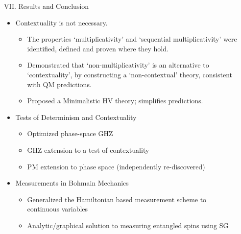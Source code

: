 \documentclass[final,hyperref={pdfpagelabels=false}]{beamer}
\begin{document}
\begin{frame}[t]
\begin{columns}[c]
\begin{column}{.69\textwidth}
\begin{columns}[b]
\begin{column}{.48\textwidth}

        \end{column}

        \begin{column}{.47\textwidth}



          \begin{block}{VII. Results and Conclusion}
            \begin{itemize}
            \item Contextuality is not necessary.
              {\tiny
              \begin{itemize}
              \item The properties `multiplicativity' and `sequential multiplicativity' were identified, defined and proven where they hold.
              \item Demonstrated that `non-multiplicativity' is an alternative to `contextuality', by constructing a `non-contextual' theory, consistent with QM predictions.
              \item Proposed a Minimalistic HV theory; simplifies predictions.
              \end{itemize}}
            \item Tests of Determinism and Contextuality
              {\tiny
              \begin{itemize}
                \item Optimized phase-space GHZ
                \item GHZ extension to a test of contextuality
                \item PM extension to phase space (independently re-discovered)
              \end{itemize}}
            \item Measurements in Bohmain Mechanics
              {\tiny
              \begin{itemize}
                \item Generalized the Hamiltonian based measurement scheme to continuous variables
                \item Analytic/graphical solution to measuring entangled spins using SG

\end{itemize}}
\end{itemize}
\end{block}
\end{column}
\end{columns}
\end{column}
\end{columns}
\end{frame}
\end{document}
